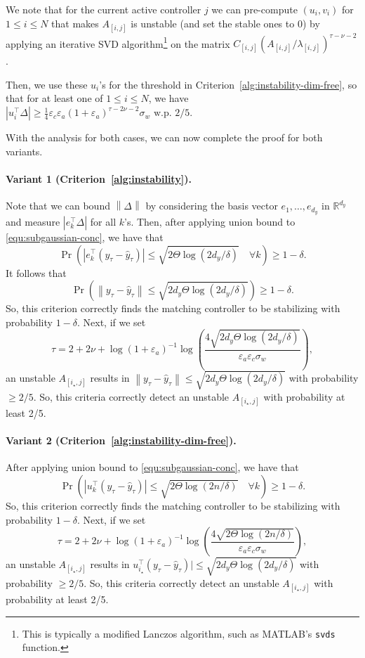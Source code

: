\documentclass[11pt, twoside]{article}
\newcounter{criteria}
\theoremstyle{definition}
\newcommand{\RR}{\mathbb{R}}
\newcommand{\norm}[1]{\left\lVert #1 \right\rVert}
\begin{document}
We note that for the current active controller $j$ we can pre-compute $(u_{i}, v_{i})$ for $1 \le i \le N$ that makes $A_{[i,j]}$ is unstable (and set the stable ones to 0) by applying an iterative SVD algorithm\footnote{This is typically a modified Lanczos algorithm, such as MATLAB's \texttt{svds} function.} on the matrix $C_{[i,j]} (A_{[i,j]} / \lambda_{[i,j]})^{\tau-\nu-2}$.

Then, we use these $u_i$'s for the threshold in Criterion~\ref{alg:instability-dim-free}, so that for at least one of $1 \le i \le N$, we have $|u_i^\top \Delta| \ge \frac{1}{4}\varepsilon_c \varepsilon_a (1+\varepsilon_a)^{\tau-2\nu-2} \sigma_w \text{ w.p. } 2/5$.

With the analysis for both cases, we can now complete the proof for both variants.

\paragraph{Variant 1 (Criterion~\ref{alg:instability}).}
Note that we can bound $\norm{\Delta}$ by considering the basis vector $e_1, \dots, e_{d_y}$ in $\RR^{d_y}$ and measure $|e_k^\top \Delta|$ for all $k$'s.
Then, after applying union bound to \eqref{equ:subgaussian-conc}, we have that 
\[\Pr\left(|e_k^\top(y_{\tau} - \hat{y}_{\tau})| \le \sqrt{2\Theta\log(2d_y/\delta)} \quad  \forall k\right) \ge 1 - \delta.\]
It follows that
\[\Pr\left(\norm{y_{\tau} - \hat{y}_{\tau}} \le \sqrt{2d_y\Theta\log(2d_y/\delta)}\right) \ge 1 - \delta.\]
So, this criterion correctly finds the matching controller to be stabilizing with probability $1-\delta$.
Next, if we set
\[\tau = 2 + 2 \nu + \log(1+\varepsilon_a)^{-1} \log\left(\frac{4\sqrt{2d_y\Theta\log(2d_y/\delta)}}{\varepsilon_a \varepsilon_c \sigma_w}\right),\]
an unstable $A_{[i_\star, j]}$ results in $\norm{y_{\tau} - \hat{y}_{\tau}} \le \sqrt{2d_y\Theta\log(2d_y/\delta)}$ with probability $\ge 2/5$.
So, this criteria correctly detect an unstable $A_{[i_\star, j]}$ with probability at least 2/5.

\paragraph{Variant 2 (Criterion~\ref{alg:instability-dim-free}).}
After applying union bound to \eqref{equ:subgaussian-conc}, we have that 
\[\Pr\left(|u_k^\top(y_{\tau} - \hat{y}_{\tau})| \le \sqrt{2\Theta\log(2n/\delta)} \quad  \forall k\right) \ge 1 - \delta.\]
So, this criterion correctly finds the matching controller to be stabilizing with probability $1-\delta$.
Next, if we set
\[\tau = 2 + 2 \nu + \log(1+\varepsilon_a)^{-1} \log\left(\frac{4\sqrt{2\Theta\log(2n/\delta)}}{\varepsilon_a \varepsilon_c \sigma_w}\right),\]
an unstable $A_{[i_\star, j]}$ results in $u_{i_\star}^\top(y_{\tau} - \hat{y}_{\tau})| \le \sqrt{2d_y\Theta\log(2d_y/\delta)}$ with probability $\ge 2/5$.
So, this criteria correctly detect an unstable $A_{[i_\star, j]}$ with probability at least 2/5. 
\end{document}
